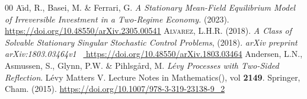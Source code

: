 \documentclass{article}
\begin{document}
%
\nocite{*}
\begin{thebibliography}{00}
A{\"\i}d, R., Basei, M. \& Ferrari, G.  
\textit{A Stationary Mean-Field Equilibrium Model of Irreversible Investment in a Two-Regime Economy.} (2023).
\url{ 	https://doi.org/10.48550/arXiv.2305.00541} 
\textsc{Alvarez, L.H.R.} (2018). \textit{A Class of Solvable Stationary Singular Stochastic Control Problems}, (2018).
\textit{arXiv preprint arXiv:1803.03464v1}  \
\url{ 	https://doi.org/10.48550/arXiv.1803.03464} 
Andersen, L.N., Asmussen, S., Glynn, P.W. \& Pihlsgård, M. \textit{ L\'evy Processes with Two-Sided Reflection}. L\'evy Matters V. Lecture Notes in Mathematics(), vol \textbf{ 2149}. Springer, Cham. (2015). \url{https://doi.org/10.1007/978-3-319-23138-9_2}



\end{thebibliography}
\end{document}
